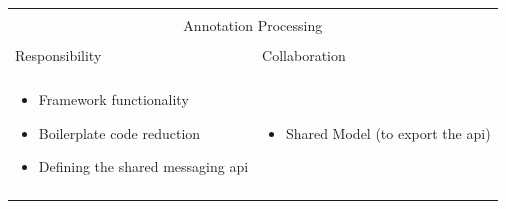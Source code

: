 \noindent
\begin{tabular}{|l|l|}
    \cline{1-2}
    \multicolumn{2}{|c|}{} \\[-0.3cm]
    \multicolumn{2}{|c|}{Annotation Processing} \\ 
    \multicolumn{2}{|c|}{} \\[-0.3cm]
    \cline{1-2}
    Responsibility & Collaboration \\
    \cline{1-2}
    & \\[-0.2cm]
    \begin{minipage}{0.47\textwidth}
        \begin{itemize}
          \item Framework functionality\footnotemark 
          \item Boilerplate code reduction
          \item Defining the shared messaging \gls{api}
        \end{itemize} 
    \end{minipage}
	&
    \begin{minipage}{0.47\textwidth}
        \begin{itemize}
          \item Shared Model (to export the \gls{api})
        \end{itemize} 
    \end{minipage}
	\\ & \\
    \hline
\end{tabular}

          
